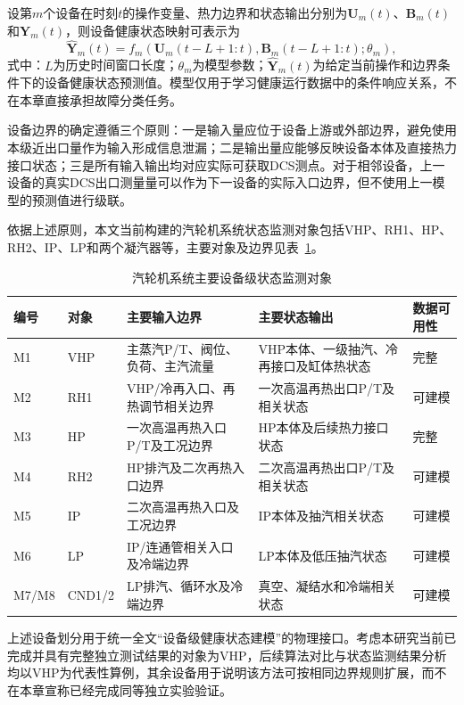 设第$m$个设备在时刻$t$的操作变量、热力边界和状态输出分别为$\mathbf U_m(t)$、$\mathbf B_m(t)$和$\mathbf Y_m(t)$，则设备健康状态映射可表示为
\begin{equation}
\hat{\mathbf Y}_m(t)=f_m\left(\mathbf U_m(t-L+1:t),\mathbf B_m(t-L+1:t);\theta_m\right),
\end{equation}
式中：$L$为历史时间窗口长度；$\theta_m$为模型参数；$\hat{\mathbf Y}_m(t)$为给定当前操作和边界条件下的设备健康状态预测值。模型仅用于学习健康运行数据中的条件响应关系，不在本章直接承担故障分类任务。

设备边界的确定遵循三个原则：一是输入量应位于设备上游或外部边界，避免使用本级近出口量作为输入形成信息泄漏；二是输出量应能够反映设备本体及直接热力接口状态；三是所有输入输出均对应实际可获取DCS测点。对于相邻设备，上一设备的真实DCS出口测量量可以作为下一设备的实际入口边界，但不使用上一模型的预测值进行级联。

依据上述原则，本文当前构建的汽轮机系统状态监测对象包括VHP、RH1、HP、RH2、IP、LP和两个凝汽器等，主要对象及边界见表~\ref{tab:system_objects_v4}。

\begin{table}[htbp]
    \centering
    \caption{汽轮机系统主要设备级状态监测对象}
    \label{tab:system_objects_v4}
    \begin{tabular}{p{1.3cm}p{2.6cm}p{4.4cm}p{4.4cm}p{1.5cm}}
        \toprule
        编号 & 对象 & 主要输入边界 & 主要状态输出 & 数据可用性 \\
        \midrule
        M1 & VHP & 主蒸汽P/T、阀位、负荷、主汽流量 & VHP本体、一级抽汽、冷再接口及缸体热状态 & 完整 \\
        M2 & RH1 & VHP/冷再入口、再热调节相关边界 & 一次高温再热出口P/T及相关状态 & 可建模 \\
        M3 & HP & 一次高温再热入口P/T及工况边界 & HP本体及后续热力接口状态 & 完整 \\
        M4 & RH2 & HP排汽及二次再热入口边界 & 二次高温再热出口P/T及相关状态 & 可建模 \\
        M5 & IP & 二次高温再热入口及工况边界 & IP本体及抽汽相关状态 & 可建模 \\
        M6 & LP & IP/连通管相关入口及冷端边界 & LP本体及低压抽汽状态 & 可建模 \\
        M7/M8 & CND1/2 & LP排汽、循环水及冷端边界 & 真空、凝结水和冷端相关状态 & 可建模 \\
        \bottomrule
    \end{tabular}
\end{table}

上述设备划分用于统一全文“设备级健康状态建模”的物理接口。考虑本研究当前已完成并具有完整独立测试结果的对象为VHP，后续算法对比与状态监测结果分析均以VHP为代表性算例，其余设备用于说明该方法可按相同边界规则扩展，而不在本章宣称已经完成同等独立实验验证。

